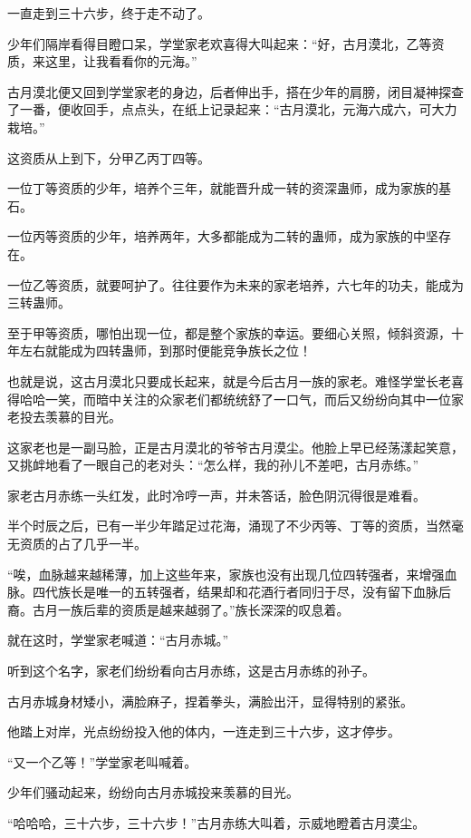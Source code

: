 \begin{this_body}
一直走到三十六步，终于走不动了。

少年们隔岸看得目瞪口呆，学堂家老欢喜得大叫起来：“好，古月漠北，乙等资质，来这里，让我看看你的元海。”

古月漠北便又回到学堂家老的身边，后者伸出手，搭在少年的肩膀，闭目凝神探查了一番，便收回手，点点头，在纸上记录起来：“古月漠北，元海六成六，可大力栽培。”

这资质从上到下，分甲乙丙丁四等。

一位丁等资质的少年，培养个三年，就能晋升成一转的资深蛊师，成为家族的基石。

一位丙等资质的少年，培养两年，大多都能成为二转的蛊师，成为家族的中坚存在。

一位乙等资质，就要呵护了。往往要作为未来的家老培养，六七年的功夫，能成为三转蛊师。

至于甲等资质，哪怕出现一位，都是整个家族的幸运。要细心关照，倾斜资源，十年左右就能成为四转蛊师，到那时便能竞争族长之位！

也就是说，这古月漠北只要成长起来，就是今后古月一族的家老。难怪学堂长老喜得哈哈一笑，而暗中关注的众家老们都统统舒了一口气，而后又纷纷向其中一位家老投去羡慕的目光。

这家老也是一副马脸，正是古月漠北的爷爷古月漠尘。他脸上早已经荡漾起笑意，又挑衅地看了一眼自己的老对头：“怎么样，我的孙儿不差吧，古月赤练。”

家老古月赤练一头红发，此时冷哼一声，并未答话，脸色阴沉得很是难看。

半个时辰之后，已有一半少年踏足过花海，涌现了不少丙等、丁等的资质，当然毫无资质的占了几乎一半。

“唉，血脉越来越稀薄，加上这些年来，家族也没有出现几位四转强者，来增强血脉。四代族长是唯一的五转强者，结果却和花酒行者同归于尽，没有留下血脉后裔。古月一族后辈的资质是越来越弱了。”族长深深的叹息着。

就在这时，学堂家老喊道：“古月赤城。”

听到这个名字，家老们纷纷看向古月赤练，这是古月赤练的孙子。

古月赤城身材矮小，满脸麻子，捏着拳头，满脸出汗，显得特别的紧张。

他踏上对岸，光点纷纷投入他的体内，一连走到三十六步，这才停步。

“又一个乙等！”学堂家老叫喊着。

少年们骚动起来，纷纷向古月赤城投来羡慕的目光。

“哈哈哈，三十六步，三十六步！”古月赤练大叫着，示威地瞪着古月漠尘。


\end{this_body}
